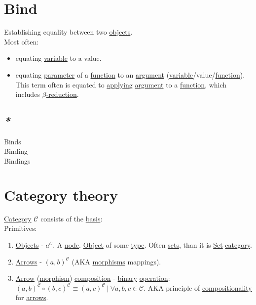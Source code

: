 \documentclass[a4paper,14pt,oneside]{book}
\begin{document}
\chapter{\label{orgfd2c016}Bind}
\label{sec:orga9af3dd}
Establishing equality between two \hyperref[orgc973d87]{objects}.\\

Most often:\\
\begin{itemize}
\item equating \hyperref[org4af7747]{variable} to a value.\\
\item equating \hyperref[orga2e5d96]{parameter} of a \hyperref[org39271b2]{function} to an \hyperref[orgc64e250]{argument} (\hyperref[org4af7747]{variable}/value/\hyperref[org39271b2]{function}). This term often is equated to \hyperref[org580eafc]{applying} \hyperref[orgc64e250]{argument} to a \hyperref[org39271b2]{function}, which includes \hyperref[orga87647e]{\(\beta\)-reduction}.\\
\end{itemize}

\section{\emph{*}}
\label{sec:org5a55567}

\label{org734b952}Binds\\
\label{org73123b0}Binding\\
\label{org5c0ab3f}Bindings\\

\chapter{\label{org69d2887}Category theory}
\label{sec:org2b96649}
\hyperref[org74d6ac5]{Category} \(\mathcal{C}\) consists of the \hyperref[org2273500]{basis}:\\

Primitives:\\
\begin{enumerate}
\item \hyperref[orgc973d87]{Objects} - \(a^{\mathcal{C}}\). A \hyperref[org60da876]{node}. \hyperref[org920c789]{Object} of some \hyperref[orgdbcea73]{type}. Often \hyperref[org6681e41]{sets}, than it is \hyperref[org2ca93d9]{Set} \hyperref[org74d6ac5]{category}.\\
\item \hyperref[org94bcc2e]{Arrows} - \({(a,b)}^{\mathcal{C}}\) (AKA \hyperref[org801ca09]{morphisms} mappings).\\
\item \hyperref[org6d9e214]{Arrow} (\hyperref[orga7d420f]{morphism}) \hyperref[orgde6ed92]{composition} - \hyperref[orgd4bd390]{binary} \hyperref[org53f0458]{operation}: \({(a, b)}^{\mathcal{C}} \circ {(b, c)}^{\mathcal{C}} \equiv {(a, c)}^{\mathcal{C}} \ | \ \forall a, b, c \in \mathcal{C}\). AKA principle of \hyperref[org88ac17c]{compositionality} for \hyperref[org94bcc2e]{arrows}.\\
\end{enumerate}
\end{document}
